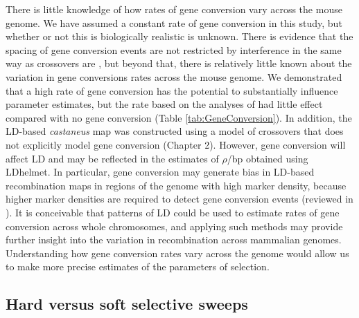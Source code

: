 {	There is little knowledge of how rates of gene conversion vary across the mouse genome. We have assumed a constant rate of gene conversion in this study, but whether or not this is biologically realistic is unknown. There is evidence that the spacing of gene conversion events are not restricted by interference in the same way as crossovers are \cite{RN263}, but beyond that, there is relatively little known about the variation in gene conversions rates across the mouse genome. We demonstrated that a high rate of gene conversion has the potential to substantially influence parameter estimates, but the rate based on the analyses of \cite{RN263} had little effect compared with no gene conversion (Table \ref{tab:GeneConversion}). In addition, the LD-based \textit{castaneus} map was constructed using a model of crossovers that does not explicitly model gene conversion (Chapter 2). However, gene conversion will affect LD and may be reflected in the estimates of $\rho$/bp obtained using LDhelmet. In particular, gene conversion may generate bias in LD-based recombination maps in regions of the genome with high marker density, because higher marker densities are required to detect gene conversion events (reviewed in \citealt{RN394}). It is conceivable that patterns of LD could be used to estimate rates of gene conversion across whole chromosomes, and applying such methods may provide further insight into the variation in recombination across mammalian genomes. Understanding how gene conversion rates vary across the genome would allow us to make more precise estimates of the parameters of selection.

\subsection{Hard versus soft selective sweeps}


}
